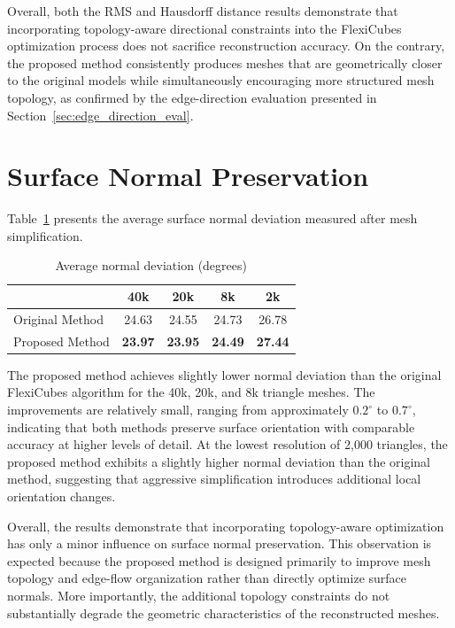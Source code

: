 \documentclass[../main.tex]{subfiles}
\begin{document}
Overall, both the RMS and Hausdorff distance results demonstrate that incorporating topology-aware directional constraints into the FlexiCubes optimization process does not sacrifice reconstruction accuracy. On the contrary, the proposed method consistently produces meshes that are geometrically closer to the original models while simultaneously encouraging more structured mesh topology, as confirmed by the edge-direction evaluation presented in Section~\ref{sec:edge_direction_eval}.

\section{Surface Normal Preservation}

Table~\ref{tab:normal_results} presents the average surface normal deviation measured after mesh simplification.

\begin{table}[H]
	\centering
	\caption{Average normal deviation (degrees)}
	\label{tab:normal_results}
	\begin{tabular}{lcccc}
		\hline
		& 40k & 20k & 8k & 2k \\
		\hline
		Original Method & 24.63 & 24.55 & 24.73 & 26.78 \\
		Proposed Method & \textbf{23.97} & \textbf{23.95} & \textbf{24.49} & \textbf{27.44} \\
		\hline
	\end{tabular}
\end{table}

The proposed method achieves slightly lower normal deviation than the original FlexiCubes algorithm for the 40k, 20k, and 8k triangle meshes. The improvements are relatively small, ranging from approximately $0.2^\circ$ to $0.7^\circ$, indicating that both methods preserve surface orientation with comparable accuracy at higher levels of detail. At the lowest resolution of 2,000 triangles, the proposed method exhibits a slightly higher normal deviation than the original method, suggesting that aggressive simplification introduces additional local orientation changes.

Overall, the results demonstrate that incorporating topology-aware optimization has only a minor influence on surface normal preservation. This observation is expected because the proposed method is designed primarily to improve mesh topology and edge-flow organization rather than directly optimize surface normals. More importantly, the additional topology constraints do not substantially degrade the geometric characteristics of the reconstructed meshes.
\end{document}
